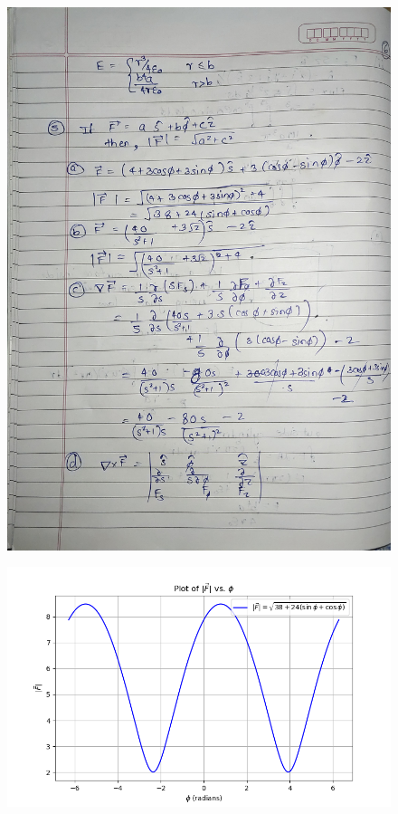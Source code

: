 \documentclass{article}
\begin{document}
\begin{figure}[H]
    \centering
    \includegraphics[width=\textwidth]{figs/written/6.jpg}
\end{figure}
\begin{figure}[H]
    \centering
    \includegraphics[width=\textwidth]{figs/5a.png}
\end{figure}
\end{document}
